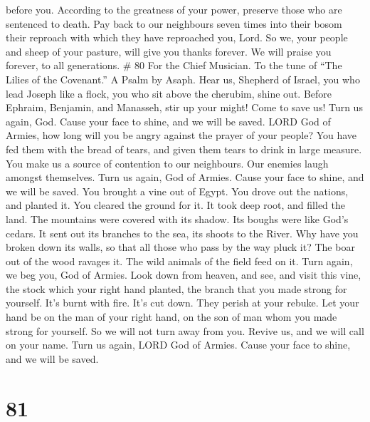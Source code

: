 before you. According to the greatness of your power, preserve those who
are sentenced to death.  Pay back to our neighbours seven
times into their bosom their reproach with which they have reproached
you, Lord.  So we, your people and sheep of your pasture,
will give you thanks forever. We will praise you forever, to all
generations. \# 80 For the Chief Musician. To the tune of ``The Lilies
of the Covenant.'' A Psalm by Asaph.  Hear us, Shepherd of
Israel, you who lead Joseph like a flock, you who sit above the
cherubim, shine out.  Before Ephraim, Benjamin, and
Manasseh, stir up your might! Come to save us!  Turn us
again, God. Cause your face to shine, and we will be saved. 
LORD God of Armies, how long will you be angry against the prayer of
your people?  You have fed them with the bread of tears, and
given them tears to drink in large measure.  You make us a
source of contention to our neighbours. Our enemies laugh amongst
themselves.  Turn us again, God of Armies. Cause your face
to shine, and we will be saved.  You brought a vine out of
Egypt. You drove out the nations, and planted it.  You
cleared the ground for it. It took deep root, and filled the land.
 The mountains were covered with its shadow. Its boughs
were like God's cedars.  It sent out its branches to the
sea, its shoots to the River.  Why have you broken down its
walls, so that all those who pass by the way pluck it?  The
boar out of the wood ravages it. The wild animals of the field feed on
it.  Turn again, we beg you, God of Armies. Look down from
heaven, and see, and visit this vine,  the stock which your
right hand planted, the branch that you made strong for yourself.
 It's burnt with fire. It's cut down. They perish at your
rebuke.  Let your hand be on the man of your right hand, on
the son of man whom you made strong for yourself.  So we
will not turn away from you. Revive us, and we will call on your name.
 Turn us again, LORD God of Armies. Cause your face to
shine, and we will be saved.

\hypertarget{section-73}{%
\section{81}\label{section-73}}

